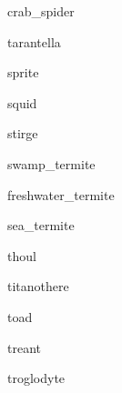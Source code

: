 \documentclass[letterpaper,serif]{module}
\begin{document}
\begin{newmonster}{crab_spider}\end{newmonster}

\begin{newmonster}{tarantella}\end{newmonster}

\begin{newmonster}{sprite}\end{newmonster}

\begin{newmonster}{squid}\end{newmonster}

\begin{newmonster}{stirge}\end{newmonster}


\begin{newmonster}{swamp_termite}\end{newmonster}

\begin{newmonster}{freshwater_termite}\end{newmonster}

\begin{newmonster}{sea_termite}\end{newmonster}

\begin{newmonster}{thoul}\end{newmonster}

\begin{newmonster}{titanothere}\end{newmonster}

\begin{newmonster}{toad}\end{newmonster}

\begin{newmonster}{treant}\end{newmonster}

\begin{newmonster}{troglodyte}\end{newmonster}
\end{document}
